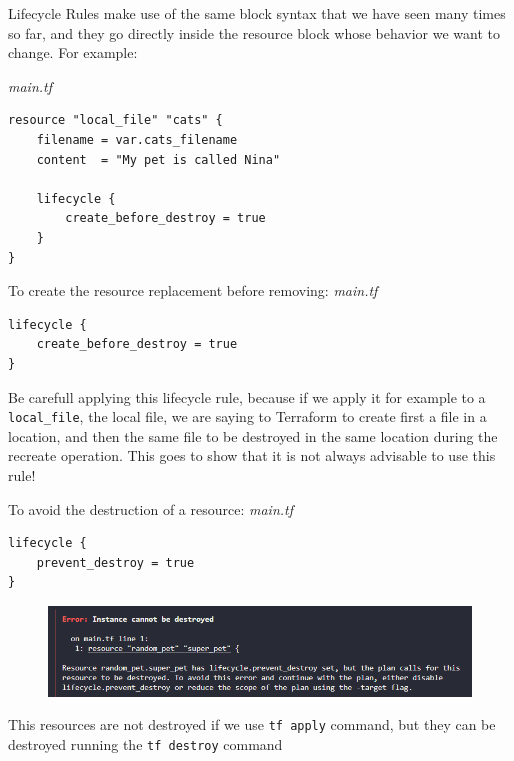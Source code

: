 \documentclass{article}
\newenvironment{blocktemplateIII}[1]{%
    \tcolorbox[beamer,%
    noparskip,breakable,
    ,colframe=Red,%
    colbacklower=LimeGreen!75!LightGreen,%
    title=#1]}%
    {\endtcolorbox}
\newenvironment{codetemplate}[1][]{%
  \mybasecolorbox[#1]
  \itshape
}{%
  \endmybasecolorbox
}
\begin{document}
Lifecycle Rules make use of the same block syntax that we have seen many times so far, and they go directly inside the resource block whose behavior we want to change. For example:

\begin{codetemplate}{main.tf}
\begin{verbatim}
resource "local_file" "cats" {
    filename = var.cats_filename
    content  = "My pet is called Nina"
    
    lifecycle {
        create_before_destroy = true
    }
}
\end{verbatim}
\end{codetemplate}

To create the resource replacement before removing:
\begin{codetemplate}{main.tf}
\begin{verbatim}
lifecycle {
    create_before_destroy = true
}
\end{verbatim}
\end{codetemplate}

\begin{blocktemplateIII}{WARNING}
Be carefull applying this lifecycle rule, because if we apply it for example to a \verb+local_file+, the local file, we are saying to Terraform to create first a file in a location, and then the same file to be destroyed in the same location during the recreate operation. This goes to show that it is not always advisable to use this rule!
\end{blocktemplateIII}

To avoid the destruction of a resource:
\begin{codetemplate}{main.tf}
\begin{verbatim}
lifecycle {
    prevent_destroy = true
}
\end{verbatim}
\end{codetemplate}

\begin{figure}[H]
    \includegraphics[width=\textwidth]{pictures/pic11.png}
    \centering
\end{figure}

\begin{blocktemplateIII}{WARNING}
This resources are not destroyed if we use \verb+tf apply+ command, but they can be destroyed running the \verb+tf destroy+ command
\end{blocktemplateIII}
\end{document}
